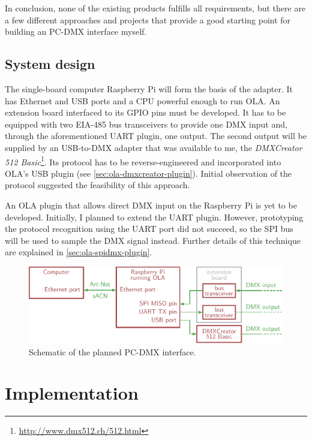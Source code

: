 In conclusion, none of the existing products fulfills all requirements,
but there are a few different approaches and projects that provide a
good starting point for building an PC-DMX interface myself.

\hypertarget{sec:design}{\section{System design}\label{sec:design}}

The single-board computer Raspberry Pi will form the basis of the
adapter. It has Ethernet and USB ports and a CPU powerful enough to run
OLA. An extension board interfaced to its GPIO pins must be developed.
It has to be equipped with two EIA-485 bus transceivers to provide one
DMX input and, through the aforementioned UART plugin, one output. The
second output will be supplied by an USB-to-DMX adapter that was
available to me, the \emph{DMXCreator 512 Basic}\footnote{\url{http://www.dmx512.ch/512.html}}.
Its protocol has to be reverse-engineered and incorporated into OLA's
USB plugin (see \cref{sec:ola-dmxcreator-plugin}). Initial observation
of the protocol suggested the feasibility of this approach.

An OLA plugin that allows direct DMX input on the Raspberry Pi is yet to
be developed. Initially, I planned to extend the UART plugin. However,
prototyping the protocol recognition using the UART port did not
succeed, so the SPI bus will be used to sample the DMX signal instead.
Further details of this technique are explained in
\cref{sec:ola-spidmx-plugin}.

\begin{figure}
\centering
\includegraphics[width=1.00000\textwidth]{Bilder/system-design-schematic.pdf}
\caption[Schematic of the planned PC-DMX
interface]{Schematic of the planned PC-DMX
interface.}\label{fig:system-design-schematic}
\end{figure}

\cleardoublepage\hypertarget{sec:implementation}{\chapter{Implementation}\label{sec:implementation}}

